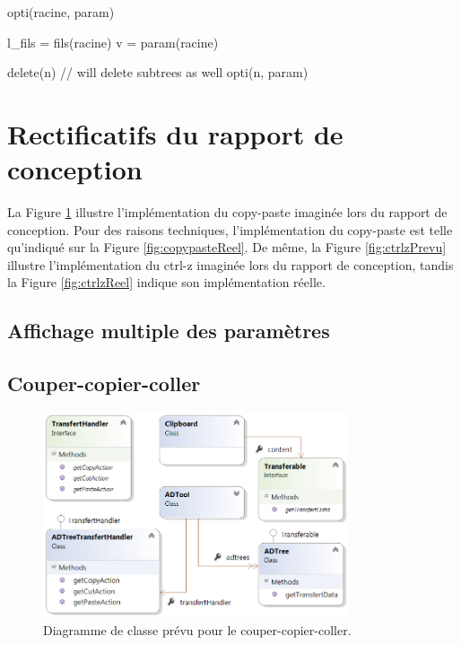          \begin{algorithm}[h!]
            \caption{opti(racine, param)}
            \label{algo:opti}
            \begin{algorithmic}
                \STATE l\_fils = fils(racine)
                    \RETURN
                \ENDIF
                \STATE
                    \STATE v = param(racine)

                            \STATE delete(n) // will delete subtrees as well
                        \ENDIF
                    \ENDFOR
                \ENDIF
                \STATE
                    \STATE opti(n, param)
                \ENDFOR
            \end{algorithmic}
        \end{algorithm}

\newpage
\section{Rectificatifs du rapport de conception}
\label{sec:rectConc}

La {\sc Figure} \ref{fig:copypastePrevu} illustre l'implémentation du copy-paste imaginée lors du rapport de conception. Pour des raisons techniques, l'implémentation du copy-paste est telle qu'indiqué sur la {\sc Figure} \ref{fig:copypasteReel}. De même, la {\sc Figure} \ref{fig:ctrlzPrevu} illustre l'implémentation du ctrl-z imaginée lors du rapport de conception, tandis la {\sc Figure} \ref{fig:ctrlzReel} indique son implémentation réelle.

	\subsection{Affichage multiple des paramètres}

	\subsection{Couper-copier-coller}
		\begin{figure}
            \centering
                \includegraphics[width=0.8\textwidth]{figure/copiercoller.png}
            \caption{Diagramme de classe prévu pour le couper-copier-coller.}
            \label{fig:copypastePrevu}
        \end{figure}
        
